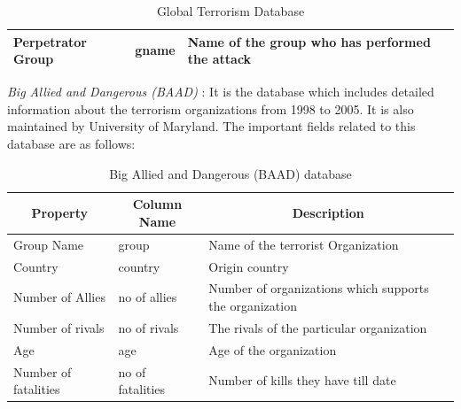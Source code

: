 \documentclass[journal,onecolumn,11pt]{IEEEtran}
\begin{document}
\begin{table}[h]
\begin{tabular}{|l|l|l|}
Perpetrator Group                       & gname                                                                  & Name of the group who has performed the attack                                                                                                                                                                                                                                                                                                                                                                               \\ \hline
\end{tabular}
\caption{Global Terrorism Database}
\egroup
\end{table}
\newpage
\textit{Big Allied and Dangerous (BAAD)} :  It is the database which includes detailed information about the terrorism organizations from 1998 to 2005. It is also maintained by University of Maryland. The important fields related to this database are as follows: \cite{baad}
\begin{table}[h]
\centering
\fontsize{11}{9}\selectfont
\bgroup
\def\arraystretch{1.5}
\begin{tabular}{|l|l|l|}
\hline
\multicolumn{1}{|c|}{\textbf{Property}} & \multicolumn{1}{c|}{\textbf{Column Name}} & \multicolumn{1}{c|}{\textbf{Description}}               \\ \hline
Group Name                              & group                                     & Name of the terrorist Organization                      \\ \hline
Country                                 & country                                   & Origin country                                          \\ \hline
Number of Allies                        & no of allies                              & Number of organizations which supports the organization \\ \hline
Number of rivals                        & no of rivals                              & The rivals of the particular organization               \\ \hline
Age                                     & age                                       & Age of the organization                                 \\ \hline
Number of fatalities                    & no of fatalities                          & Number of kills they have till date                     \\ \hline
\end{tabular}
\caption{Big Allied and Dangerous (BAAD) database}
\egroup
\end{table}
\end{document}
